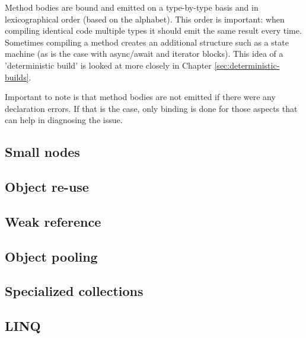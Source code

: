 Method bodies are bound and emitted on a type-by-type basis and in lexicographical order (based on the alphabet). This order is important: when compiling identical code multiple types it should emit the same result every time. Sometimes compiling a method creates an additional structure such as a state machine (as is the case with async/await and iterator blocks). This idea of a 'deterministic build' is looked at more closely in Chapter \ref{sec:deterministic-builds}. 

Important to note is that method bodies are not emitted if there were any declaration errors. If that is the case, only binding is done for those aspects that can help in diagnosing the issue.\cite{Sadov2014}


\subsection{Small nodes}
\label{sec:small-nodes}

\subsection{Object re-use}
\label{sec:object-reuse}

\subsection{Weak reference}
\label{sec:weak-references}

\subsection{Object pooling}
\label{sec:object-pooling}

\subsection{Specialized collections}
\label{sec:specialized-collections}

\subsection{LINQ}
\label{sec:linq}
















